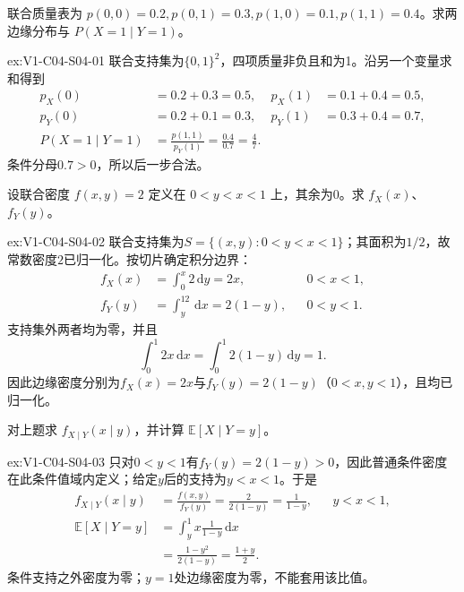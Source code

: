 \begin{SLChapterExercisePairSection}
\begin{exercise}\label{ex:V1-C04-S04-01}
联合质量表为 $p(0,0)=0.2,p(0,1)=0.3,p(1,0)=0.1,p(1,1)=0.4$。求两边缘分布与 $P(X=1\mid Y=1)$。
\end{exercise}
\label{sol:V1-C04-S04-01}
\begin{chapterexercisesolution}{ex:V1-C04-S04-01}
联合支持集为$\{0,1\}^2$，四项质量非负且和为1。沿另一个变量求和得到
\[
\begin{aligned}
p_X(0)&=0.2+0.3=0.5,
&p_X(1)&=0.1+0.4=0.5,\\
p_Y(0)&=0.2+0.1=0.3,
&p_Y(1)&=0.3+0.4=0.7,\\
P(X=1\mid Y=1)&=\frac{p(1,1)}{p_Y(1)}
=\frac{0.4}{0.7}=\frac47.
\end{aligned}
\]
条件分母$0.7>0$，所以后一步合法。
\end{chapterexercisesolution}

\begin{exercise}\label{ex:V1-C04-S04-02}
设联合密度 $f(x,y)=2$ 定义在 $0<y<x<1$ 上，其余为0。求 $f_X(x)$、$f_Y(y)$。
\end{exercise}
\label{sol:V1-C04-S04-02}
\begin{chapterexercisesolution}{ex:V1-C04-S04-02}
联合支持集为$S=\{(x,y):0<y<x<1\}$；其面积为$1/2$，故常数密度$2$已归一化。按切片确定积分边界：
\[
\begin{aligned}
f_X(x)&=\int_0^x2\,\mathrm dy=2x,
&&0<x<1,\\
f_Y(y)&=\int_y^12\,\mathrm dx=2(1-y),
&&0<y<1.
\end{aligned}
\]
支持集外两者均为零，并且
\[
\int_0^1 2x\,\mathrm dx=\int_0^1 2(1-y)\,\mathrm dy=1.
\]
因此边缘密度分别为$f_X(x)=2x$与$f_Y(y)=2(1-y)$（$0<x,y<1$），且均已归一化。
\end{chapterexercisesolution}

\begin{exercise}\label{ex:V1-C04-S04-03}
对上题求 $f_{X\mid Y}(x\mid y)$，并计算 $\mathbb E[X\mid Y=y]$。
\end{exercise}
\label{sol:V1-C04-S04-03}
\begin{chapterexercisesolution}{ex:V1-C04-S04-03}
只对$0<y<1$有$f_Y(y)=2(1-y)>0$，因此普通条件密度在此条件值域内定义；给定$y$后的支持为$y<x<1$。于是
\[
\begin{aligned}
f_{X\mid Y}(x\mid y)
&=\frac{f(x,y)}{f_Y(y)}
=\frac{2}{2(1-y)}=\frac1{1-y},
&&y<x<1,\\
\mathbb E[X\mid Y=y]
&=\int_y^1x\frac1{1-y}\,\mathrm dx\\
&=\frac{1-y^2}{2(1-y)}=\frac{1+y}{2}.
\end{aligned}
\]
条件支持之外密度为零；$y=1$处边缘密度为零，不能套用该比值。
\end{chapterexercisesolution}


\end{SLChapterExercisePairSection}
